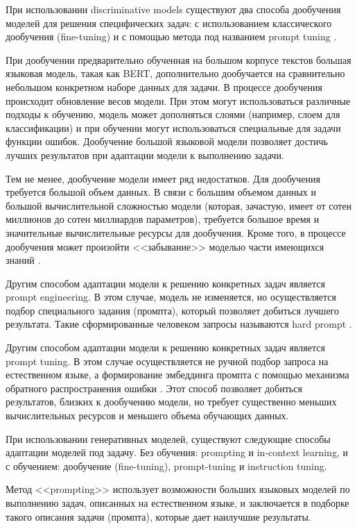 При использовании discriminative models существуют два способа дообучения моделей для решения специфических задач: с использованием классического дообучения (fine-tuning) и с помощью метода под названием prompt tuning \cite{llm_rs_survey}.

При дообучении предварительно обученная на большом корпусе текстов большая языковая модель, такая как BERT, дополнительно дообучается на сравнительно небольшом конкретном наборе данных для задачи. В процессе дообучения происходит обновление весов модели. При этом могут использоваться различные подходы к обучению, модель может дополняться слоями (например, слоем для классификации) и при обучении могут использоваться специальные для задачи функции ошибок. Дообучение большой языковой модели позволяет достичь лучших результатов при адаптации модели к выполнению задачи.

Тем не менее, дообучение модели имеет ряд недостатков. Для дообучения требуется большой объем данных. В связи с большим объемом данных и большой вычислительной сложностью модели (которая, зачастую, имеет от сотен миллионов до сотен миллиардов параметров), требуется большое время и значительные вычислительные ресурсы для дообучения. Кроме того, в процессе дообучения может произойти <<забывание>> моделью части имеющихся знаний \cite{prompt_tuning}.

Другим способом адаптации модели к решению конкретных задач является prompt engineering. В этом случае, модель не изменяется, но осуществляется подбор специального задания (промпта), который позволяет добиться лучшего результата. Такие сформированные человеком запросы называются hard prompt \cite{prompt_tuning}.

Другим способом адаптации модели к решению конкретных задач является prompt tuning. В этом случае осуществляется не ручной подбор запроса на естественном языке, а формирование эмбеддинга промпта с помощью механизма обратного распространения ошибки \cite{prompt_tuning}. Этот способ позволяет добиться результатов, близких к дообучению модели, но требует существенно меньших вычислительных ресурсов и меньшего объема обучающих данных.

При использовании генеративных моделей, существуют следующие способы адаптации моделей под задачу. Без обучения: prompting и in-context learning, и с обучением: дообучение (fine-tuning), prompt-tuning и instruction tuning.

Метод <<prompting>> использует возможности больших языковых моделей по выполнению задач, описанных на естественном языке, и заключается в подборке такого описания задачи (промпта), которые дает наилучшие результаты.

